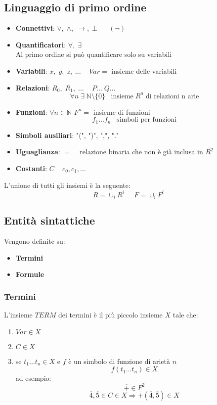\documentclass{article}
\theoremstyle{break}
\theoremstyle{break}
\theoremstyle{break}
\theoremstyle{break}
\begin{document}
\subsection{Linguaggio di primo ordine}
\begin{itemize}
  \item \textbf{Connettivi}: \( \vee,\; \wedge,\; \to,\; \bot\;\;\;\;\;\;(\neg) \) 
  \item \textbf{Quantificatori}: \( \forall,\; \exists \)\\
    Al primo ordine si può quantificare solo su variabili
  \item \textbf{Variabili}: \( x,\;y,\;z,\; \ldots \) \(\;\;\; Var = \) insieme delle variabili
  \item \textbf{Relazioni}: \( R_0,\; R_1,\; \ldots \) \( \;\;\; P \ldots \;Q \ldots \) 
    \[
      \forall n\; \exists\; \mathbb{N} \setminus \{0\} \;\;\; \text{insieme} \; R^n\; \text{di relazioni n arie}
    \] 
  \item \textbf{Funzioni}: \( \forall n \in \mathbb{N} \) \( F^n =\) insieme di funzioni 
    \[
      f_1 \ldots f_n \;\;\; \text{simboli per funzioni}
    \] 
  \item \textbf{Simboli ausiliari}: "(", ")", ",", "."
  \item \textbf{Uguaglianza}: \( =\;\;\; \) relazione binaria che non è già inclusa in \( R^2 \)  
  \item \textbf{Costanti}: \( C\;\;\; \) \( c_0, c_1, \ldots \)  
\end{itemize}
L'unione di tutti gli insiemi è la seguente:
\[
  R = \cup_i R^i \;\;\;\;\; F = \cup_i F^i
\] 
\subsection{Entità sintattiche}
Vengono definite su:
\begin{itemize}
  \item \textbf{Termini}
  \item \textbf{Formule}
\end{itemize}

\subsubsection{Termini}
L'insieme \( TERM \) dei termini è il più piccolo insieme \( X \) tale che:
\begin{enumerate}
  \item \( Var \in X \)
  \item \( C \in X \)
  \item se \( t_1 \ldots t_n \in X \) e \( f \) è un simbolo di funzione di arietà \( n \) 
    \[
      f(t_1 \ldots t_n) \in X
    \] 
    ad esempio:
    \[
      \overline{+} \in F^2
    \] 
    \[
      \overline{4}, \overline{5} \in C \in X \Rightarrow \overline{+}(\overline{4}, \overline{5}) \in X
    \] 
\end{enumerate}
\end{document}
